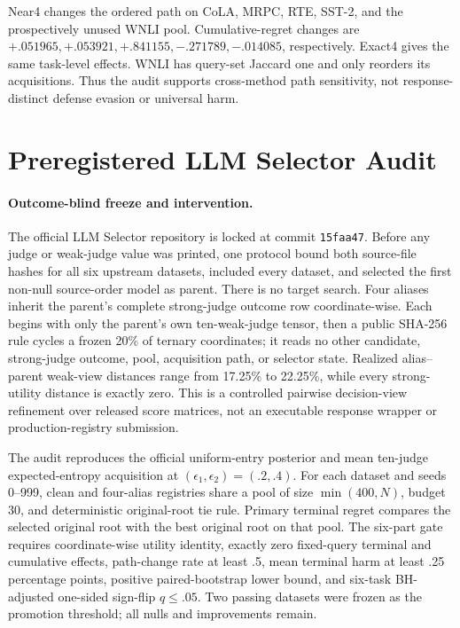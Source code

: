 Near4 changes the ordered path on CoLA, MRPC, RTE, SST-2, and the prospectively unused WNLI pool. Cumulative-regret changes are $+.051965,+.053921,+.841155,-.271789,-.014085$, respectively. Exact4 gives the same task-level effects. WNLI has query-set Jaccard one and only reorders its acquisitions. Thus the audit supports cross-method path sensitivity, not response-distinct defense evasion or universal harm.

\section{Preregistered LLM Selector Audit}
\label{app:step88}

\paragraph{Outcome-blind freeze and intervention.}
The official LLM Selector repository is locked at commit \texttt{15faa47}. Before any judge or weak-judge value was printed, one protocol bound both source-file hashes for all six upstream datasets, included every dataset, and selected the first non-null source-order model as parent. There is no target search. Four aliases inherit the parent's complete strong-judge outcome row coordinate-wise. Each begins with only the parent's own ten-weak-judge tensor, then a public SHA-256 rule cycles a frozen 20\% of ternary coordinates; it reads no other candidate, strong-judge outcome, pool, acquisition path, or selector state. Realized alias--parent weak-view distances range from 17.25\% to 22.25\%, while every strong-utility distance is exactly zero. This is a controlled pairwise decision-view refinement over released score matrices, not an executable response wrapper or production-registry submission.

The audit reproduces the official uniform-entry posterior and mean ten-judge expected-entropy acquisition at $(\epsilon_1,\epsilon_2)=(.2,.4)$. For each dataset and seeds 0--999, clean and four-alias registries share a pool of size $\min(400,N)$, budget 30, and deterministic original-root tie rule. Primary terminal regret compares the selected original root with the best original root on that pool. The six-part gate requires coordinate-wise utility identity, exactly zero fixed-query terminal and cumulative effects, path-change rate at least .5, mean terminal harm at least .25 percentage points, positive paired-bootstrap lower bound, and six-task BH-adjusted one-sided sign-flip $q\leq.05$. Two passing datasets were frozen as the promotion threshold; all nulls and improvements remain.

